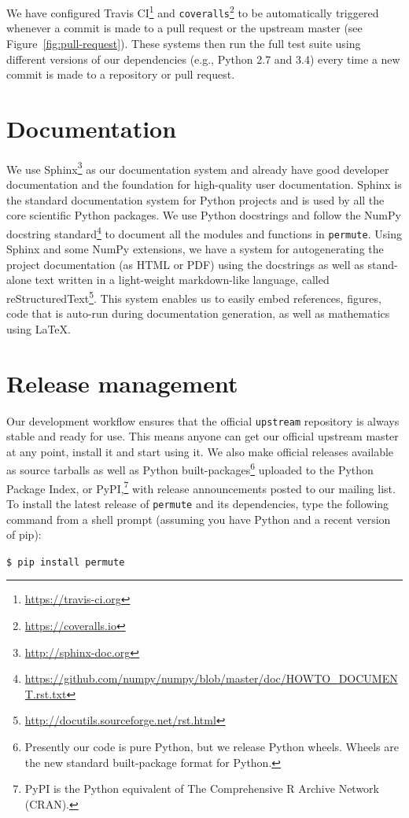 We have configured Travis CI\footnote{\url{https://travis-ci.org}} and
\texttt{coveralls}\footnote{\url{https://coveralls.io}} to be automatically
triggered whenever a commit is made to a pull request or the upstream master
(see Figure~\ref{fig:pull-request}).  These systems then run the full
test suite  using different versions of our dependencies (e.g., Python 2.7 and
3.4) every time a new commit is made to a repository or pull request.

\section{\label{sec:doc}Documentation}

We use Sphinx\footnote{\url{http://sphinx-doc.org}} as our documentation system
and already have good developer documentation and the foundation for
high-quality user documentation. Sphinx is the standard documentation system
for Python projects and is used by all the core scientific Python packages.
We use Python docstrings and follow the NumPy docstring
standard\footnote{\url{https://github.com/numpy/numpy/blob/master/doc/HOWTO\_DOCUMENT.rst.txt}}
to document all the modules and functions in \texttt{permute}.  Using Sphinx
and some NumPy extensions, we have a system for autogenerating the project
documentation (as HTML or PDF) using the docstrings as well as stand-alone text
written in a light-weight markdown-like language, called
reStructuredText\footnote{\url{http://docutils.sourceforge.net/rst.html}}.
This system enables us to easily embed references, figures, code that is
auto-run during documentation generation, as well as mathematics using \LaTeX.

\section{\label{sec:release}Release management}

Our development workflow ensures that the official \texttt{upstream} repository
is always stable and ready for use.  This means anyone can get our official
upstream master at any point, install it and start using it.  We also make
official releases available as source tarballs as well as Python
built-packages\footnote{Presently our code is pure Python, but we release
Python wheels.  Wheels are the new standard built-package format for Python.}
uploaded to the Python Package Index, or PyPI,\footnote{PyPI is the Python
equivalent of The Comprehensive R Archive Network (CRAN).} with release
announcements posted to our mailing list.  To install the latest release of
\texttt{permute} and its dependencies, type the following command from a shell
prompt (assuming you have Python and a recent version of pip): 

\texttt{\$ pip install permute}
